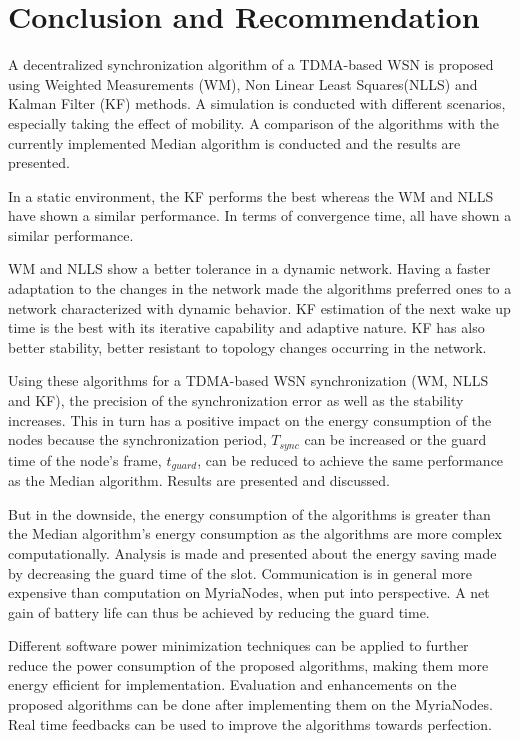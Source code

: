 \documentclass[journal]{IEEEtran}
\begin{document}
\section{\textbf{Conclusion and Recommendation}}
A decentralized synchronization algorithm of a TDMA-based WSN is proposed using Weighted Measurements (WM), Non Linear Least Squares(NLLS) and Kalman Filter (KF) methods. A simulation is conducted with different scenarios, especially taking the effect of mobility. A comparison of the algorithms with the currently implemented Median algorithm is conducted and the results are presented.
\par
In a static environment, the KF performs the best whereas the WM and NLLS have shown a similar performance. In terms of convergence time, all have shown a similar performance.
\par
WM and NLLS show a better tolerance in a dynamic network. Having a
faster adaptation to the changes in the network made the algorithms
preferred ones to a network characterized with dynamic behavior. KF
estimation of the next wake up time is the best with its iterative
capability and adaptive nature. KF has also better stability, better
resistant to topology changes occurring in the network.
\par
Using these algorithms for a TDMA-based WSN synchronization (WM, NLLS and KF), the precision of the synchronization error as well as the stability increases. This in turn has a positive impact on the energy consumption of the nodes because the synchronization period, $T_{sync}$ can be increased or the guard time of the node's frame, $t_{guard}$, can be reduced to achieve the same performance as the Median algorithm. Results are presented and discussed.
\par But in the downside, the energy consumption of the algorithms is greater than the Median algorithm's energy consumption as the algorithms are more complex computationally. Analysis is made and presented about the energy saving made by decreasing the guard time of the slot. Communication is in general more expensive than computation on MyriaNodes, when put into perspective. A net gain of battery life can thus be achieved by reducing the guard time.
\par Different software power minimization techniques can be applied to further reduce the power consumption of the proposed algorithms, making them more energy efficient for implementation. Evaluation and enhancements on the proposed algorithms can be done after implementing them on the MyriaNodes. Real time feedbacks can be used to improve the algorithms towards perfection.
\end{document}
